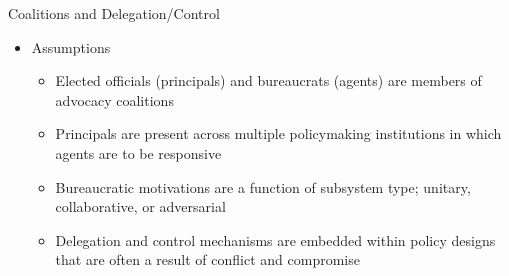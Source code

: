 \documentclass{beamer}
\begin{document}
\begin{frame}{Coalitions and Delegation/Control}

\begin{itemize}
\itemsep1pt\parskip0pt
\item
  Assumptions

  \begin{itemize}
  \itemsep1pt\parskip0pt
  \item
    Elected officials (principals) and bureaucrats (agents) are members
    of advocacy coalitions \pause
    \vspace{0.1in}
  \item
    Principals are present across multiple policymaking institutions in
    which agents are to be responsive \pause
    \vspace{0.1in}
  \item
    Bureaucratic motivations are a function of subsystem type; unitary,
    collaborative, or adversarial \pause
    \vspace{0.1in}
  \item
    Delegation and control mechanisms are embedded within policy designs
    that are often a result of conflict and compromise
  \end{itemize}
\end{itemize}

\end{frame}
\end{document}
